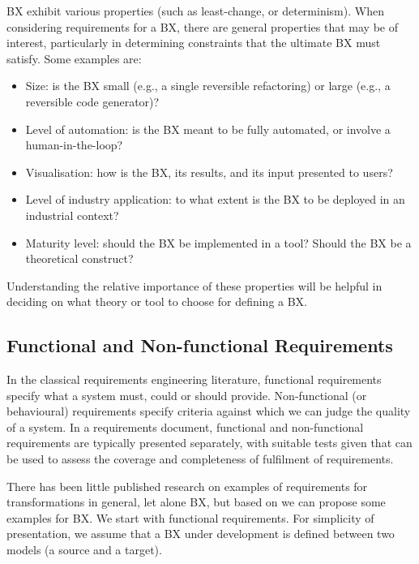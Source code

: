BX exhibit various properties (such as least-change, or determinism). When considering requirements for a BX, there are general properties that may be of interest, particularly in determining constraints that the ultimate BX must satisfy. Some examples are:
\begin{itemize}
\item Size: is the BX small (e.g., a single reversible refactoring) or large (e.g., a reversible code generator)? 
\item Level of automation: is the BX meant to be fully automated, or involve a human-in-the-loop?
\item Visualisation: how is the BX, its results, and its input presented to users?
\item Level of industry application: to what extent is the BX to be deployed in an industrial context?
\item Maturity level: should the BX be implemented in a tool? Should the BX be a theoretical construct?
\end{itemize}
Understanding the relative importance of these properties will be helpful in deciding on what theory or tool to choose for defining a BX.

\subsection{Functional and Non-functional Requirements}
In the classical requirements engineering literature, functional requirements specify what a system must, could or should provide. Non-functional (or behavioural) requirements specify criteria against which we can judge the quality of a system. In a requirements document, functional and non-functional requirements are typically presented separately, with suitable tests given that can be used to assess the coverage and completeness of fulfilment of requirements.

There has been little published research on examples of requirements for transformations in general, let alone BX, but based on \cite{TehraniZL16,NalchigarSC13} we can propose some examples for BX. We start with functional requirements. For simplicity of presentation, we assume that a BX under development is defined between two models (a source and a target).

